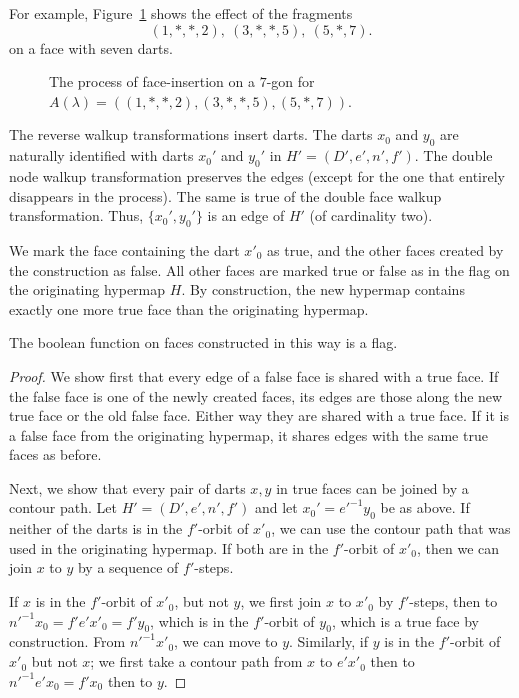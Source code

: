 For example, Figure~\ref{fig:7darts} shows the effect of the fragments
$$(1,*,*,2),\ (3,*,*,5),\ (5,*,7).
  $$ on a face with seven darts.


\begin{figure}[htb]
  \centering
  \caption{The process of face-insertion on a $7$-gon for
   $A(\lambda) = ((1,*,*,2),(3,*,*,5),(5,*,7))$.}
  \label{fig:7darts}
\end{figure}

The reverse walkup transformations insert darts.  The darts $x_0$ and
$y_0$ are naturally identified with darts $x_0'$ and $y_0'$ in $H'=(D',e',n',f')$.
The double node walkup transformation preserves the edges (except for
the one that entirely disappears in the process).  The same is true of the
double face walkup transformation.  Thus, $\{x_0',y_0'\}$ is an edge of
$H'$ (of cardinality two).

We mark the face containing the dart $x'_0$ as true, and the other
faces created by the construction as false.   All other faces are
marked true or false as in the flag on the originating hypermap $H$.  By
construction, the new hypermap contains exactly one more true face
than the originating hypermap.

\begin{lemma}\label{lemma:flag} 
The boolean function on faces constructed in this way is a
flag.
\end{lemma}

\begin{proof}  We show first that every edge of a false face is shared
with a true face.  If the false face is one of the newly created
faces, its edges are those along the new true face or the old false
face. Either way they are shared with a true face.   If it is a
false face from the originating hypermap, it shares edges with the
same true faces as before.

Next, we show that every pair of darts $x,y$ in true faces can be
joined by a contour path.  Let $H'=(D',e',n',f')$ and let
$x_0' = e'^{-1} y_0$ be as above.  If neither of the darts is in the
$f'$-orbit of $x'_0$, we can use the contour path that was used in the
originating hypermap.  If both are in the $f'$-orbit of $x'_0$, then
we can join $x$ to $y$ by a sequence of $f'$-steps.

If $x$ is in the $f'$-orbit of $x'_0$, but not $y$, we first join $x$
to $x'_0$ by $f'$-steps, then to $n'^{-1} x_0 = f' e' x'_0 = f' y_0$, 
which is in
the $f'$-orbit of $y_0$, which is a true face by construction.
From $n'^{-1} x'_0$, we can move to $y$.
Similarly, if $y$ is in the $f'$-orbit of $x'_0$ but not $x$; we first
take a contour path from $x$ to $e' x'_0$ then to $n'^{-1} e' x_0 = f'
x_0$ then to $y$.
\end{proof}

